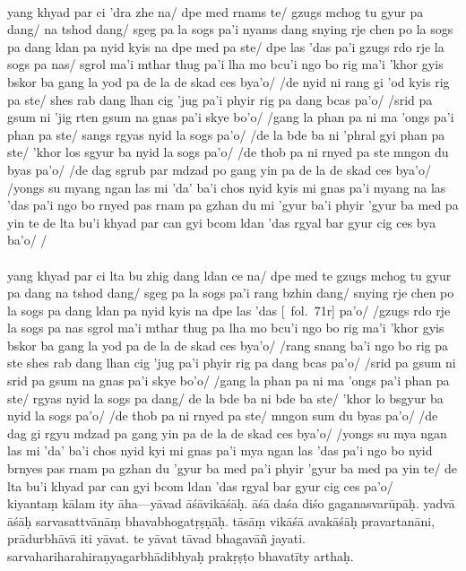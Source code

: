 \documentclass[12pt]{article}
\newcommand{\emdash} {\hspace{0em}—\hspace{0em}}
\begin{document}
\textbf{\TVA}\\
yang khyad par ci 'dra zhe na/ dpe med rnams te/ gzugs mchog tu gyur pa dang/ na tshod dang/ sgeg pa la sogs pa'i nyams dang snying rje chen po la sogs pa dang ldan pa nyid kyis na dpe med pa ste/ dpe las 'das pa'i gzugs rdo rje la sogs pa nas/ sgrol ma'i mthar thug pa'i lha mo bcu'i ngo bo rig ma'i 'khor gyis bskor ba gang la yod pa de la de skad ces bya'o/ /de nyid ni rang gi 'od kyis rig pa ste/ shes rab dang lhan cig 'jug pa'i phyir rig pa dang bcas pa'o/ /srid pa gsum ni 'jig rten gsum na gnas pa'i skye bo'o/ /gang la phan pa ni ma 'ongs pa'i phan pa ste/ sangs rgyas nyid la sogs pa'o/ /de la bde ba ni 'phral gyi phan pa ste/ 'khor los sgyur ba nyid la sogs pa'o/ /de thob pa ni rnyed pa ste mngon du byas pa'o/ /de dag sgrub par mdzad po gang yin pa de la de skad ces bya'o/ /yongs su myang ngan las mi 'da' ba'i chos nyid kyis mi gnas pa'i myang na las 'das pa'i ngo bo rnyed pas rnam pa gzhan du mi 'gyur ba'i phyir 'gyur ba med pa yin te de lta bu'i khyad par can gyi bcom ldan 'das rgyal bar gyur cig ces bya ba'o/ /\\

\textbf{\TVB}\\
yang khyad par ci lta bu zhig dang ldan ce na/ dpe med te gzugs mchog tu gyur pa dang na tshod dang/ sgeg pa la sogs pa'i rang bzhin dang/ snying rje chen po la sogs pa dang ldan pa nyid kyis na dpe las 'das [\TVB\ fol.\ 71r] pa'o/ /gzugs rdo rje la sogs pa nas sgrol ma'i mthar thug pa lha mo bcu'i ngo bo rig ma'i 'khor gyis bskor ba gang la yod pa de la de skad ces bya'o/ /rang snang ba'i ngo bo rig pa ste shes rab dang lhan cig 'jug pa'i phyir rig pa dang bcas pa'o/ /srid pa gsum ni srid pa gsum na gnas pa'i skye bo'o/ /gang la phan pa ni ma 'ongs pa'i phan pa ste/ rgyas nyid la sogs pa dang/ de la bde ba ni bde ba ste/ 'khor lo bsgyur ba nyid la sogs pa'o/ /de thob pa ni rnyed pa ste/ mngon sum du byas pa'o/ /de dag gi rgyu mdzad pa gang yin pa de la de skad ces bya'o/ /yongs su mya ngan las mi 'da' ba'i chos nyid kyi mi gnas pa'i mya ngan las 'das pa'i ngo bo nyid brnyes pas rnam pa gzhan du 'gyur ba med pa'i phyir 'gyur ba med pa yin te/ de lta bu'i khyad par can gyi bcom ldan 'das rgyal bar gyur cig ces pa'o/\\

kiyantaṃ kālam ity āha\emdash yāvad āśāvikāśāḥ.\footnoteB{
	āśāvikāsāḥ] \corr ; āśāvikāśāḥ \EDD\ \MS
} āśā daśa diśo gaganasvarūpāḥ. yadvā āśāḥ sarvasattvānāṃ bhavabhogatṛṣṇāḥ.\footnoteB{
	°tṛṣṇāḥ] \EDD\ (°tṛṣṇās); tṛṣṇā \MS
} tāsāṃ vikāśā\footnoteB{
	vikāśā] \corr; vikāsā \MS\ \EDD
} avakāśāḥ pravartanāni, prādurbhāvā iti yāvat.
te yāvat\footnoteB{
	te yāvat] \emd ; tā yāvat \MS\ \EDD\ deest \emph{in \TIB}
} tāvad bhagavāñ jayati.
sarvahariharahiraṇyagarbhādibhyaḥ prakṛṣṭo bhavatīty arthaḥ.\\
\end{document}
